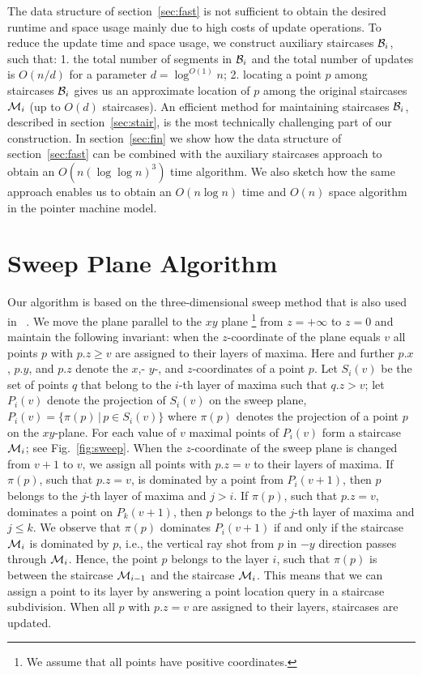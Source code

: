 \documentclass[10pt]{llncs}
\newcommand{\cM}{{\cal M}}
\newcommand{\cB}{{\cal B}}
\begin{document}
The data structure of section~\ref{sec:fast} is not sufficient to obtain 
the desired runtime and space usage mainly due to high costs of  update 
operations. To reduce the update time and space usage,  we construct 
auxiliary staircases $\cB_i$, such that: 1. the total number 
of segments in $\cB_i$ and the total number of updates is  $O(n/d)$ 
for a parameter $d=\log^{O(1)} n$; 
2. locating a point $p$ among staircases $\cB_i$ gives us an approximate 
location of $p$ among the original staircases $\cM_i$ (up to $O(d)$ 
staircases).
An efficient method 
for maintaining staircases $\cB_i$, described in section~\ref{sec:stair}, 
is the most technically challenging part of our construction.
In section~\ref{sec:fin} we show how the data structure of
 section~\ref{sec:fast} can be combined with the auxiliary staircases 
approach to obtain an $O(n(\log \log n)^3)$ time algorithm. 
We also sketch how the same approach enables us to obtain 
an $O(n\log n)$ time and $O(n)$ space algorithm in the pointer machine model.




\section{Sweep Plane Algorithm}
\label{sec:over}
Our algorithm is based on the three-dimensional sweep method that is also 
used in ~\cite{BG04}. We move the plane parallel to the $xy$ plane
\footnote{We assume that all points have positive coordinates.} from 
$z=+\infty$ to
 $z=0$ and
 maintain the following invariant: when the $z$-coordinate of the plane 
equals $v$ all points $p$ with $p.z\geq v$ are assigned to their layers of
maxima. 
Here and further $p.x$, $p.y$, and $p.z$ denote the $x$,- $y$-, and
 $z$-coordinates of a point $p$.
Let $S_i(v)$ be the set of points $q$ that belong to the $i$-th layer of
maxima 
such that $q.z>v$; let $P_i(v)$ denote the projection of $S_i(v)$ on the 
sweep plane, $P_i(v)=\{\pi(p)\,|\, p\in S_i(v)\}$ where $\pi(p)$ denotes the 
projection of a point $p$ on the $xy$-plane. For each value of $v$ maximal 
points of  $P_i(v)$  form a staircase $\cM_i$; see Fig.~\ref{fig:sweep}. 
When the $z$-coordinate of the sweep plane is changed from  $v+1$ to $v$, 
we assign all points with $p.z=v$  to their layers of maxima. 
If $\pi(p)$, such that $p.z = v$,  
is dominated by a point from $P_i(v+1)$, then $p$ belongs to the $j$-th 
layer of maxima and $j>i$. If $\pi(p)$, such that $p.z=v$, dominates a point 
on $P_k(v+1)$, then $p$ belongs to the $j$-th layer of maxima and $j\leq k$.
We observe that $\pi(p)$ dominates $P_i(v+1)$ if and only if 
the staircase $\cM_i$ is dominated by  $p$, 
i.e., the vertical ray shot from $p$ in $-y$ direction passes through $\cM_i$.  
Hence, the point $p$ belongs to the layer $i$, such that 
$\pi(p)$ is between the staircase $\cM_{i-1}$ and the staircase $\cM_i$.
This means that we can assign a point to its layer by answering a point 
location query in a staircase subdivision. 
When all $p$ with $p.z=v$ are assigned to their layers, staircases
 are updated.
\end{document}
